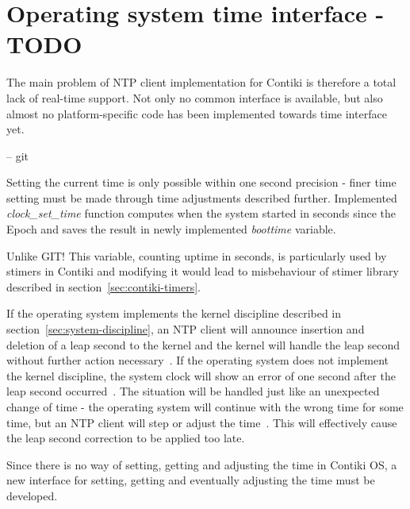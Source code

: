 
\section{Operating system time interface - TODO}
The main problem of NTP client implementation for Contiki is therefore a total
lack of real-time support.
Not only no common interface is available, but also
almost no platform-specific code has been implemented towards time interface yet.



-- git

Setting the current time is only possible within one second precision -
finer time setting must be made through time adjustments described further.
Implemented {\it{clock\_set\_time}} function computes when the system started
in seconds since the Epoch and saves the result in newly implemented {\it{boottime}} variable.



Unlike GIT!
This variable, counting uptime in seconds,
is particularly used by stimers in Contiki
and modifying it would lead to misbehaviour of stimer library
described in section~\ref{sec:contiki-timers}.


If the operating system implements the kernel discipline described in section~\ref{sec:system-discipline},
an NTP client will announce insertion and deletion of a leap second to the kernel and
the kernel will handle the leap second without further action necessary~\cite{ntp-faq}.
If the operating system does not implement the kernel discipline,
the system clock will show an error of one second after the leap second occurred~\cite{ntp-faq}.
The situation will be handled just like an unexpected change of time -
the operating system will continue with the wrong time for some time,
but an NTP client will step or adjust the time~\cite{ntp-faq}.
This will effectively cause the leap second correction to be applied too late.

Since there is no way of setting, getting and adjusting the time in Contiki OS,
a new interface for setting, getting and eventually
adjusting the time must be developed.
